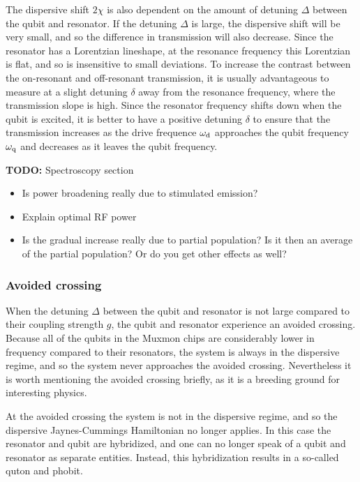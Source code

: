           The dispersive shift $2 \chi$ is also dependent on the amount of detuning $\Delta$ between the qubit and resonator. If the detuning $\Delta$ is large, the dispersive shift will be very small, and so the difference in transmission will also decrease. Since the resonator has a Lorentzian lineshape, at the resonance frequency this Lorentzian is flat, and so is insensitive to small deviations. To increase the contrast between the on-resonant and off-resonant transmission, it is usually advantageous to measure at a slight detuning $\delta$ away from the resonance frequency, where the transmission slope is high. Since the resonator frequency shifts down when the qubit is excited, it is better to have a positive detuning $\delta$ to ensure that the transmission increases as the drive frequence $\omega_\text{d}$ approaches the qubit frequency $\omega_\text{q}$ and decreases as it leaves the qubit frequency.

          \textbf{TODO:} Spectroscopy section
          \begin{itemize}
              \item Is power broadening really due to stimulated emission?
              \item Explain optimal RF power
              \item Is the gradual increase really due to partial population? Is it then an average of the partial population? Or do you get other effects as well?
          \end{itemize}


        \subsubsection{Avoided crossing}
          When the detuning $\Delta$ between the qubit and resonator is not large compared to their coupling strength $g$, the qubit and resonator experience an avoided crossing. Because all of the qubits in the Muxmon chips are considerably lower in frequency compared to their resonators, the system is always in the dispersive regime, and so the system never approaches the avoided crossing. Nevertheless it is worth mentioning the avoided crossing briefly, as it is a breeding ground for interesting physics.

          At the avoided crossing the system is not in the dispersive regime, and so the dispersive Jaynes-Cummings Hamiltonian no longer applies. In this case the resonator and qubit are hybridized, and one can no longer speak of a qubit and resonator as separate entities. Instead, this hybridization results in a so-called quton and phobit.

